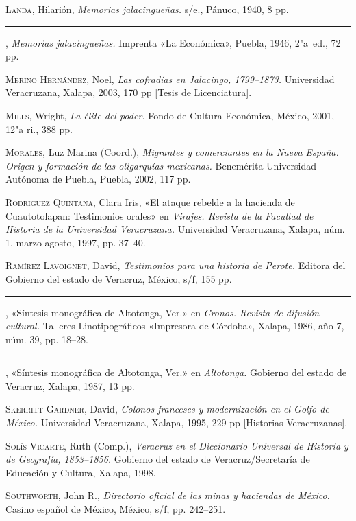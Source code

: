 \documentclass[14pt,twoside,final]{extbook} %
\begin{document}
\textsc{Landa}, Hilarión, \emph{Memorias jalacingueñas.} s/e., Pánuco, 1940, 8 pp.

\rule{1cm}{0.4pt}, \emph{Memorias jalacingueñas.} Imprenta «La Económica», Puebla, 1946, 2"a~ed., 72 pp.

\textsc{Merino Hernández}, Noel, \emph{Las cofradías en Jalacingo, 1799--1873.} Universidad Veracruzana, Xalapa, 2003, 170 pp [Tesis de Licenciatura].

\textsc{Mills}, Wright, \emph{La élite del poder.} Fondo de Cultura Económica, México, 2001, 12"a ri., 388 pp.

\textsc{Morales}, Luz Marina (Coord.), \emph{Migrantes y comerciantes en la Nueva España. Origen y formación de las oligarquías mexicanas.} Benemérita Universidad Autónoma de Puebla, Puebla, 2002, 117 pp. \enlargethispage{\baselineskip}

\textsc{Rodríguez Quintana}, Clara Iris, «El ataque rebelde a la hacienda de Cuautotolapan: Testimonios orales» en \emph{Virajes. Revista de la Facultad de Historia de la Universidad Veracruzana.} Universidad Veracruzana, Xalapa, núm. 1, marzo-agosto, 1997, pp. 37--40.

\textsc{Ramírez Lavoignet}, David, \emph{Testimonios para una historia de Perote.} Editora del Gobierno del estado de Veracruz, México, s/f, 155 pp.

\rule{1cm}{0.4pt}, «Síntesis monográfica de Altotonga, Ver.» en \emph{Cronos. Revista de difusión cultural.} Talleres Linotipográficos «Impresora de Córdoba», Xalapa, 1986,
año 7, núm. 39, pp. 18--28.

\rule{1cm}{0.4pt}, «Síntesis monográfica de Altotonga, Ver.» en \emph{Altotonga.} Gobierno del estado de Veracruz, Xalapa, 1987, 13 pp.

\textsc{Skerritt Gardner}, David, \emph{Colonos franceses y modernización en el Golfo de México.} Universidad Veracruzana, Xalapa, 1995, 229 pp [Historias Veracruzanas].

\textsc{Solís Vicarte}, Ruth (Comp.), \emph{Veracruz en el Diccionario Universal de Historia y de Geografía, 1853--1856.} Gobierno del estado de Veracruz/Secreta\-ría de Educación y Cultura, Xalapa, 1998.

\textsc{Southworth}, John R., \emph{Directorio oficial de las minas y haciendas de México.} Casino español de México, México, s/f, pp. 242--251.
\end{document}
